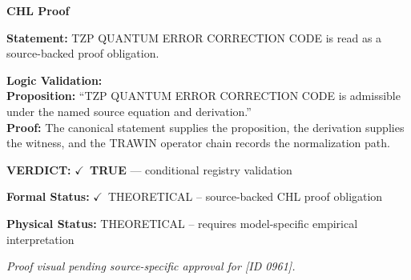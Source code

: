 \vspace{0.45em}
\noindent\textbf{CHL Proof}\par
\textbf{Statement:} TZP QUANTUM ERROR CORRECTION CODE is read as a source-backed proof obligation.

\textbf{Logic Validation:}\\
\textbf{Proposition:} ``TZP QUANTUM ERROR CORRECTION CODE is admissible under the named source equation and derivation.''\\
\textbf{Proof:} The canonical statement supplies the proposition, the derivation supplies the witness, and the TRAWIN operator chain records the normalization path.

\textbf{VERDICT:} \ensuremath{\checkmark}\ \textbf{TRUE} --- conditional registry validation

\textbf{Formal Status:} \ensuremath{\checkmark}\ THEORETICAL -- source-backed CHL proof obligation

\textbf{Physical Status:} THEORETICAL -- requires model-specific empirical interpretation
\par\vspace{0.45em}
\par
\vfill
\begingroup\footnotesize\itshape
Proof visual pending source-specific approval for [ID 0961].
\par\endgroup
\vfill
\endgroup
\endgroup
